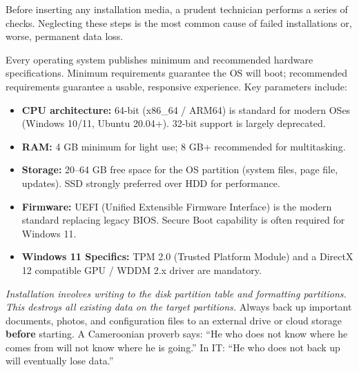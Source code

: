 \documentclass[11pt]{article}
\newcommand{\cle}[1]{{\popxbold\color{popdark}#1}}
\newcounter{popsec}
\newcounter{popsub}
\newcommand{\courssub}[1]{%
  \stepcounter{popsub}%
  \par\vspace{9pt}\noindent{\popxbold\fontsize{11.5}{13}\selectfont\color{popink}{\color{poporange}\thepopsec.\thepopsub}\hspace{6pt}#1}\par\nopagebreak\vspace{4pt}
}
\begin{document}
\courssub{Preparing for Installation}

Before inserting any installation media, a prudent technician performs a series of checks. Neglecting these steps is the most common cause of failed installations or, worse, permanent data loss.

\begin{definition}
Every operating system publishes \cle{minimum} and \cle{recommended} hardware specifications. Minimum requirements guarantee the OS will boot; recommended requirements guarantee a usable, responsive experience. Key parameters include:
\begin{itemize}
    \item \textbf{CPU architecture:} 64-bit (x86\_64 / ARM64) is standard for modern OSes (Windows 10/11, Ubuntu 20.04+). 32-bit support is largely deprecated.
    \item \textbf{RAM:} 4 GB minimum for light use; 8 GB+ recommended for multitasking.
    \item \textbf{Storage:} 20--64 GB free space for the OS partition (system files, page file, updates). SSD strongly preferred over HDD for performance.
    \item \textbf{Firmware:} UEFI (Unified Extensible Firmware Interface) is the modern standard replacing legacy BIOS. Secure Boot capability is often required for Windows 11.
    \item \textbf{Windows 11 Specifics:} TPM 2.0 (Trusted Platform Module) and a DirectX 12 compatible GPU / WDDM 2.x driver are mandatory.
\end{itemize}
\end{definition}

\begin{attention}
\emph{Installation involves writing to the disk partition table and formatting partitions. This destroys all existing data on the target partitions.} Always back up important documents, photos, and configuration files to an external drive or cloud storage \textbf{before} starting. A Cameroonian proverb says: ``He who does not know where he comes from will not know where he is going.'' In IT: ``He who does not back up will eventually lose data.''
\end{attention}
\end{document}
